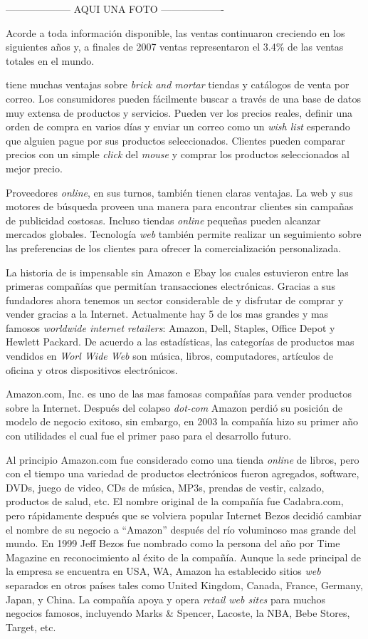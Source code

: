 -------------------- AQUI UNA FOTO -------------------

Acorde a toda información disponible, las ventas \ecommerce continuaron creciendo en los siguientes años y, a finales de 2007 ventas \ecommerce representaron el 3.4\% de las ventas totales en el mundo.

\ecommerce tiene muchas ventajas sobre \textit{brick and mortar} tiendas y catálogos de venta por correo. Los consumidores pueden fácilmente buscar a través de una base de datos muy extensa de productos y servicios. Pueden ver los precios reales, definir una orden de compra en varios días y enviar un correo como un \textit{wish list} esperando que alguien pague por sus productos seleccionados. Clientes pueden comparar precios con un simple \textit{click} del \textit{mouse} y comprar los productos seleccionados al mejor precio.

Proveedores \textit{online}, en sus turnos, también tienen claras ventajas. La web y sus motores de búsqueda proveen una manera para encontrar clientes sin campañas de publicidad costosas. Incluso tiendas \textit{online} pequeñas pueden alcanzar mercados globales. 
Tecnología \textit{web} también permite realizar un seguimiento sobre las preferencias de los clientes para ofrecer la comercialización personalizada.

La historia de \ecommerce is impensable sin Amazon e Ebay los cuales estuvieron entre las primeras compañías que permitían transacciones electrónicas. Gracias a sus fundadores ahora tenemos un sector considerable de \ecommerce y disfrutar de comprar y vender gracias a la Internet. Actualmente hay 5 de los mas grandes y mas famosos \textit{worldwide internet retailers}: Amazon, Dell, Staples, Office Depot y Hewlett Packard. De acuerdo a las estadísticas, las categorías de productos mas vendidos en \textit{Worl Wide Web} son música, libros, computadores, artículos de oficina y otros dispositivos electrónicos.

Amazon.com, Inc. es uno de las mas famosas compañías \ecommerce  para vender productos sobre la Internet. Después del colapso \textit{dot-com} Amazon perdió su posición de modelo de negocio exitoso, sin embargo, en 2003 la compañía hizo su primer año con utilidades el cual fue el primer paso para el desarrollo futuro.

Al principio Amazon.com fue considerado como una tienda \textit{online} de libros, pero con el tiempo una variedad de productos electrónicos fueron agregados, software, DVDs, juego de video, CDs de música, MP3s, prendas de vestir, calzado, productos de salud, etc. El nombre original de la compañía fue Cadabra.com, pero rápidamente después que se volviera popular Internet Bezos decidió cambiar el nombre de su negocio a “Amazon” después del río voluminoso mas grande del mundo. En 1999 Jeff Bezos fue nombrado como la persona del año por Time Magazine en reconocimiento al éxito de la compañía. Aunque la sede principal de la empresa se encuentra en USA, WA, Amazon ha establecido sitios \textit{web} separados en otros países tales como United Kingdom, Canada, France, Germany, Japan, y China. La compañía apoya y opera \textit{retail web sites} para muchos negocios famosos, incluyendo Marks \& Spencer, Lacoste, la NBA, Bebe Stores, Target, etc.

